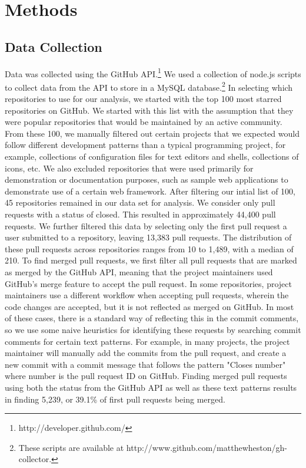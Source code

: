 \documentclass{sigchi}
\begin{document}
\section{Methods} \label{chap:methods}

\subsection{Data Collection} \label{sec:datacollection}

Data was collected using the GitHub API.\footnote{http://developer.github.com/}
We used a collection of node.js scripts to collect data from the API to store in
a MySQL database.\footnote{These scripts are available at
http://www.github.com/matthewheston/gh-collector.} In selecting which
repositories to use for our analysis, we started with the top 100 most starred
repositories on GitHub. We started with this list with the assumption that they
were popular repositories that would be maintained by an active community. From
these 100, we manually filtered out certain projects that we expected would
follow different development patterns than a typical programming project, for
example, collections of configuration files for text editors and shells,
collections of icons, etc. We also excluded repositories that were used
primarily for demonstration or documentation purposes, such as sample web
applications to demonstrate use of a certain web framework. After filtering our
intial list of 100, 45 repositories remained in our data set for analysis. We
consider only pull requests with a status of closed. This resulted in
approximately 44,400 pull requests. We further filtered this data by selecting
only the first pull request a user submitted to a repository, leaving 13,383
pull requests. The distribution of these pull requests across repositories
ranges from 10 to 1,489, with a median of 210. To find merged pull requests, we
first filter all pull requests that are marked as merged by the GitHub API,
meaning that the project maintainers used GitHub's merge feature to accept the
pull request. In some repositories, project maintainers use a different workflow
when accepting pull requests, wherein the code changes are accepted, but it is
not reflected as merged on GitHub. In most of these cases, there is a standard
way of reflecting this in the commit comments, so we use some naive heuristics
for identifying these requests by searching commit comments for certain text
patterns. For example, in many projects, the project maintainer will manually
add the commits from the pull request, and create a new commit with a commit
message that follows the pattern "Closes {number}" where {number} is the pull
request ID on GitHub. Finding merged pull requests using both the status from
the GitHub API as well as these text patterns results in finding 5,239, or
39.1\% of first pull requests being merged.
\end{document}
